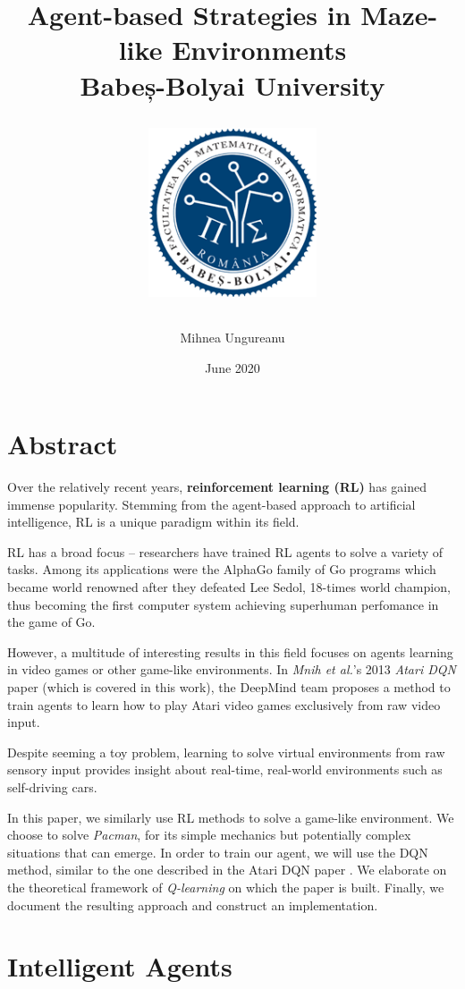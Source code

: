\documentclass[12pt,twoside]{report}
\title{
    {Agent-based Strategies in Maze-like Environments}\\
    {\large Babeș-Bolyai University}\\
    {
        \begin{figure}[h]
            \includegraphics[width=5cm]{logo_cs.png}
            \centering
        \end{figure}
    }
}
\author{Mihnea Ungureanu}
\date{June 2020}
\begin{document}
\maketitle

\chapter*{Abstract}
Over the relatively recent years, \textbf{reinforcement learning (RL)} has gained immense popularity.
Stemming from the agent-based approach to artificial intelligence, RL is a unique paradigm within its field.

RL has a broad focus -- researchers have trained RL agents to solve a variety of tasks.
Among its applications were the AlphaGo family of Go programs \cite{ago, alpha-zero} which became world renowned after they defeated Lee Sedol, 18-times world champion, thus becoming the first computer system achieving superhuman perfomance in the game of Go.

However, a multitude of interesting results in this field focuses on agents learning in video games or other game-like environments.
In \emph{Mnih et al.}'s 2013 \emph{Atari DQN} paper \cite{atari-dqn} (which is covered in this work), the DeepMind team proposes a method to train agents to learn how to play Atari video games exclusively from raw video input.

Despite seeming a toy problem, learning to solve virtual environments from raw sensory input provides insight about real-time, real-world environments such as self-driving cars.

In this paper, we similarly use RL methods to solve a game-like environment.
We choose to solve \emph{Pacman}, for its simple mechanics but potentially complex situations that can emerge.
In order to train our agent, we will use the DQN method, similar to the one described in the Atari DQN paper \cite{atari-dqn}.
We elaborate on the theoretical framework of \emph{Q-learning} on which the paper is built.
Finally, we document the resulting approach and construct an implementation.

\tableofcontents

% 

\chapter{Intelligent Agents} \label{agents-intro}

\end{document}
